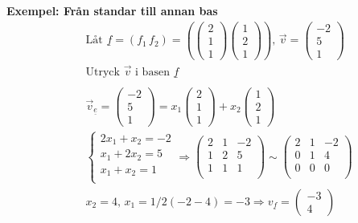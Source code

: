 \textbf{Exempel: Från standar till annan bas}
\begin{align*}
  &\quad  \text{Låt } \underline{f}=(f_1 \, f_2) =
  \left( \begin{pmatrix} 2 \\ 1 \\ 1 \end{pmatrix} \begin{pmatrix} 1 \\ 2 \\ 1 \end{pmatrix} \right), \,
  \vec{v} = \begin{pmatrix} -2 \\ 5 \\ 1 \end{pmatrix} \\
  &\quad  \text{Utryck $\vec{v}$ i basen $\underline{f}$} \\
  &\quad  \\
  &\quad  \vec{v}_{\underline{e}} = \begin{pmatrix} -2 \\ 5 \\ 1 \end{pmatrix} =
  x_1 \begin{pmatrix} 2 \\ 1 \\ 1 \end{pmatrix}  + x_2 \begin{pmatrix} 1 \\ 2 \\ 1 \end{pmatrix} \\
  &\quad \left\{\begin{array}{rr}
  2x_1 + x_2 = -2 \\
  x_1 + 2x_2 = 5  \\
  x_1 + x_2 = 1   \\
  \end{array}\right. \Rightarrow{}
  \left(\begin{array}{cc|c}
    2 & 1 & -2   \\
    1 & 2 &  5  \\
    1 & 1 &  1  \\
  \end{array}\right) \sim{}
  \left(\begin{array}{cc|c}
    2 & 1 & -2   \\
    0 & 1 &  4  \\
    0 & 0 &  0  \\
  \end{array}\right)  \\
  &\quad  x_2 = 4, \, x_1 = 1/2(-2 -4) = -3 \Rightarrow{} 
  v_{\underline{f}} = \begin{pmatrix} -3 \\ 4 \end{pmatrix} \\
\end{align*}


